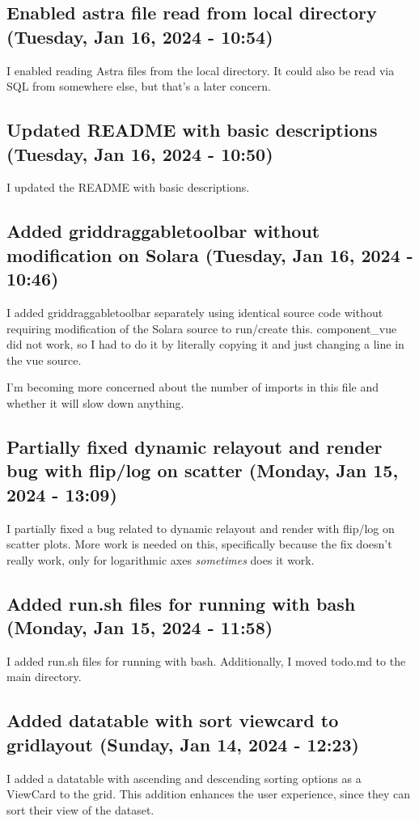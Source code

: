 \documentclass[a4paper]{article}
\begin{document}
\subsection*{Enabled astra file read from local directory (Tuesday, Jan 16, 2024 - 10:54)}
I enabled reading Astra files from the local directory. It could also be read via SQL from somewhere else, but that's a later concern.

\subsection*{Updated README with basic descriptions (Tuesday, Jan 16, 2024 - 10:50)}
I updated the README with basic descriptions.

\subsection*{Added griddraggabletoolbar without modification on Solara (Tuesday, Jan 16, 2024 - 10:46)}
I added griddraggabletoolbar separately using identical source code without requiring modification of the Solara source to run/create this. component\_vue did not work, so I had to do it by literally copying it and just changing a line in the vue source.

I'm becoming more concerned about the number of imports in this file and whether it will slow down anything.

\subsection*{Partially fixed dynamic relayout and render bug with flip/log on scatter (Monday, Jan 15, 2024 - 13:09)}
I partially fixed a bug related to dynamic relayout and render with flip/log on scatter plots. More work is needed on this, specifically because the fix doesn't really work, only for logarithmic axes \emph{sometimes} does it work.

\subsection*{Added run.sh files for running with bash (Monday, Jan 15, 2024 - 11:58)}
I added run.sh files for running with bash. Additionally, I moved todo.md to the main directory.

\subsection*{Added datatable with sort viewcard to gridlayout (Sunday, Jan 14, 2024 - 12:23)}
I added a datatable with ascending and descending sorting options as a ViewCard to the grid. This addition enhances the user experience, since they can sort their view of the dataset.
\end{document}
